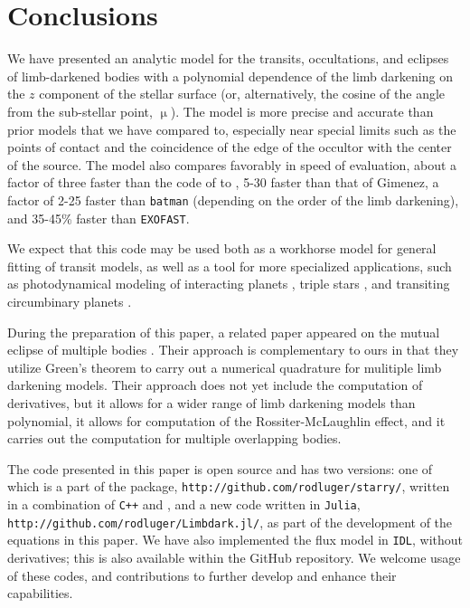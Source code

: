 \documentclass[modern,trackchanges]{aastex63}
\begin{document}
\section{Conclusions}
\label{sec:conclusions}

We have presented an analytic model for the transits, occultations, and
eclipses of limb-darkened bodies with a polynomial dependence of the limb darkening
on the $z$ component of the stellar surface (or, alternatively, the
cosine of the angle from the sub-stellar point, $\upmu$).  The model is more precise
and accurate than prior models that we have compared to, especially near
special limits such as the points of contact and the coincidence of the edge
of the occultor with the center of the source.  The model also compares favorably in
speed of evaluation, about a factor of three faster than the code of
to \citet{Pal2008}, 5-30 faster than that of Gimenez, a factor of 2-25 faster than \texttt{batman}
(depending on the order of the limb darkening), and 35-45\% faster than \texttt{EXOFAST}.

We expect that this code may be used both as a workhorse model for
general fitting of transit models, as well as a tool for more
specialized applications, such as photodynamical modeling of
interacting planets \citep{Carter2012}, triple stars \citep{Carter2011}, and
transiting circumbinary planets \citep{Doyle2011}.

During the preparation of this paper, a related paper appeared on
the mutual eclipse of multiple bodies \citep{Short2018}.  Their
approach is complementary to ours in that they utilize Green's theorem to
carry out a numerical quadrature for mulitiple limb darkening models.
Their approach does not yet include the computation of derivatives, but
it allows for a wider range of limb darkening models than polynomial, it
allows for computation of the Rossiter-McLaughlin effect, and it
carries out the computation for multiple overlapping bodies.

The code presented in this paper is open source and has two versions: one of which is a part
of the \starry package, \texttt{http://github.com/rodluger/starry/}, written
in a combination of \texttt{C++} and \Python, and a new code written in \texttt{Julia},
\texttt{http://github.com/rodluger/Limbdark.jl/}, as
part of the development of the equations in this paper.  We have also implemented
the flux model in \texttt{IDL}, without derivatives; this is also available within
the GitHub repository. We welcome usage of these
codes, and contributions to further develop and enhance their capabilities.
\end{document}
